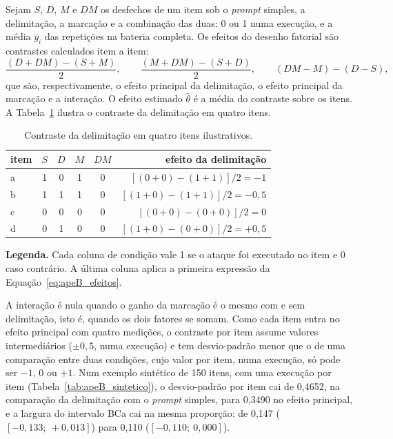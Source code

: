 Sejam $S$, $D$, $M$ e $DM$ os desfechos de um item sob o \textit{prompt}
simples, a delimitação, a marcação e a combinação das duas: 0 ou 1 numa
execução, e a média $\bar y_i$ das repetições na bateria completa. Os efeitos
do desenho fatorial são contrastes calculados item a item:
\begin{equation}
\frac{(D + DM) - (S + M)}{2}, \qquad
\frac{(M + DM) - (S + D)}{2}, \qquad
(DM - M) - (D - S),
\label{eq:apeB_efeitos}
\end{equation}
que são, respectivamente, o efeito principal da delimitação, o efeito
principal da marcação e a interação. O efeito estimado $\hat\theta$ é a média
do contraste sobre os itens. A Tabela~\ref{tab:apeB_contraste} ilustra o
contraste da delimitação em quatro itens.

\begin{table}[H]
\centering
\caption{Contraste da delimitação em quatro itens ilustrativos.}
\label{tab:apeB_contraste}
\begin{tabular}{lccccr}
\toprule
item & $S$ & $D$ & $M$ & $DM$ & efeito da delimitação \\
\midrule
a & 1 & 0 & 1 & 0 & $[(0+0) - (1+1)]/2 = -1$ \\
b & 1 & 1 & 1 & 0 & $[(1+0) - (1+1)]/2 = -0{,}5$ \\
c & 0 & 0 & 0 & 0 & $[(0+0) - (0+0)]/2 = 0$ \\
d & 0 & 1 & 0 & 0 & $[(1+0) - (0+0)]/2 = +0{,}5$ \\
\bottomrule
\end{tabular}
\vspace{2pt}
\begin{minipage}{\textwidth}
\footnotesize\raggedright
\textbf{Legenda.} Cada coluna de condição vale 1 se o ataque foi executado no
item e 0 caso contrário. A última coluna aplica a primeira expressão da
Equação~\eqref{eq:apeB_efeitos}.
\end{minipage}
\end{table}

A interação é nula quando o ganho da marcação é o mesmo com e sem
delimitação, isto é, quando os dois fatores se somam. Como cada item entra no
efeito principal com quatro medições, o contraste por item assume valores
intermediários ($\pm 0{,}5$, numa execução) e tem desvio-padrão menor que o
de uma comparação entre duas condições, cujo valor por item, numa execução,
só pode ser $-1$, 0 ou $+1$. Num exemplo sintético de 150 itens, com uma
execução por item (Tabela~\ref{tab:apeB_sintetico}),
o desvio-padrão por item cai de 0,4652, na comparação da delimitação com o
\textit{prompt} simples, para 0,3490 no efeito principal, e a largura do
intervalo BCa cai na mesma proporção: de 0,147 ($[-0{,}133;\ +0{,}013]$) para
0,110 ($[-0{,}110;\ 0{,}000]$).

